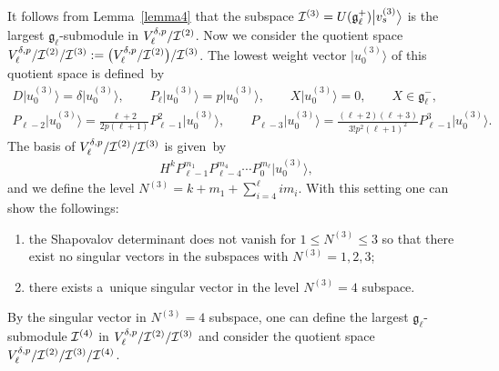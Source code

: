 It follows from Lemma~\ref{lemma4} that the subspace $ {\cal I}^{(3)} = U({\mathfrak g}_{\ell}^+) \big|v_s^{(3)}\big\rangle  $ is
the largest ${\mathfrak g}_{\ell}$-submodule in $ V^{\delta,p}_{\ell}/{\cal I}^{(2)}$.
Now we consider the quotient space $ V^{\delta,p}_{\ell}/{\cal I}^{(2)}/{\cal I}^{(3)}:= \big(V^{\delta,p}_{\ell}/{\cal
I}^{(2)}\big)/{\cal I}^{(3)}$.
The lowest weight vector $ \big|u_0^{(3)}\big\rangle  $ of this quotient space is def\/ined~by
\begin{gather*}
    D \big|u_0^{(3)}\big\rangle  = \delta \big|u_0^{(3)}\big\rangle ,
\qquad
P_{\ell} \big|u_0^{(3)}\big\rangle  = p \big|u_0^{(3)}\big\rangle ,
\qquad
    X \big|u_0^{(3)}\big\rangle  = 0, \qquad X \in {\mathfrak g}_{\ell}^-,
\nonumber
\\
    P_{\ell-2} \big|u_0^{(3)}\big\rangle  = \frac{\ell+2}{2p  (\ell+1)} P_{\ell-1}^2 \big|u_0^{(3)}\big\rangle ,
\qquad
P_{\ell-3} \big|u_0^{(3)}\big\rangle  = \frac{(\ell+2) (\ell+3)}{3!  p^2  (\ell+1)^2} P_{\ell-1}^3\big|u_0^{(3)}\big\rangle .
\end{gather*}
The basis of $ V^{\delta,p}_{\ell}/{\cal I}^{(2)}/{\cal I}^{(3)} $ is given~by
\begin{gather*}
H^k  P_{\ell-1}^{m_1} P_{\ell-4}^{m_4} \cdots P_0^{m_{\ell}} \big|u_0^{(3)}\big\rangle ,
\end{gather*}
and we def\/ine the level $  N^{(3)} = k + m_1 + \sum\limits_{i=4}^{\ell} i  m_i$.
With this setting one can show the followings:
\begin{enumerate}\itemsep=0pt
\item[i)] the Shapovalov determinant does not vanish for $ 1 \leq N^{(3)} \leq 3 $ so that there exist no singular vectors
in the subspaces with $ N^{(3)} = 1, 2, 3$;
\item[ii)] there exists a~unique singular vector in the level $ N^{(3)} = 4 $ subspace.
\end{enumerate}
By the singular vector in $ N^{(3)} = 4 $ subspace, one can def\/ine the largest ${\mathfrak g}_{\ell}$-submodule $ {\cal
I}^{(4)} $ in $ V^{\delta,p}_{\ell}/{\cal I}^{(2)}/{\cal I}^{(3)} $ and consider the quotient space $
V^{\delta,p}_{\ell}/{\cal I}^{(2)}/{\cal I}^{(3)}/{\cal I}^{(4)}$.

